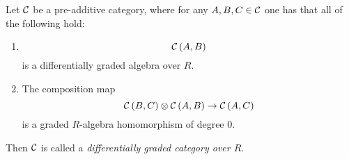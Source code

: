 \begin{definition}
    Let \( {\mathcal{C}} \) be a pre-additive category, where for any \( A, B, C \in {\mathcal{C}} \) one has that all of the following hold:
    \begin{enumerate}
        \item {
            \[
                {\mathcal{C}}\left( A, B \right)
            \]
            is a differentially graded algebra over \( R \).
        }
        \item {
            The composition map
            \[
                {\mathcal{C}}\left( B, C \right) \otimes {\mathcal{C}}\left( A, B \right)  \to {\mathcal{C}}\left( A, C \right)
            \]
            is a graded \( R \)-algebra homomorphism of degree \( 0 \).
        }
    \end{enumerate}
    Then \( {\mathcal{C}} \) is called a \emph{differentially graded category over \( R \)}.
\end{definition}
